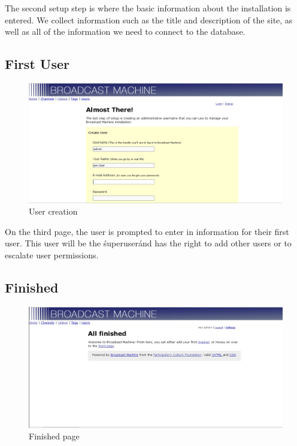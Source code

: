 \documentclass[a4paper,12pt]{report}
\begin{document}
The second setup step is where the basic information about the installation is entered.
We collect information such as the title and description of the site, as well as all of the information we need to connect to the database.

\subsection{First User}
\begin{figure}[h!]
\begin{center}
\includegraphics[width=150mm]{./images/setup3.png}
\caption{User creation}
\end{center}
\end{figure}
On the third page, the user is prompted to enter in information for their first user.
This user will be the \'superuser\' and has the right to add other users or to escalate user permissions.

\subsection{Finished}
\begin{figure}[h!]
\begin{center}
\includegraphics[width=150mm]{./images/setup4.png}
\caption{Finished page}
\end{center}
\end{figure}
\end{document}
